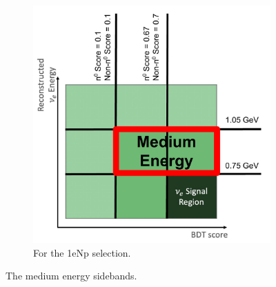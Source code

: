 \begin{figure}[H]
\begin{subfigure}{0.5\linewidth}
        \includegraphics[width=\linewidth]{technote/Sidebands/Figures/NearSideband/NpMediumEnergySideband.pdf}
        \caption{For the 1eNp selection.}
    \end{subfigure}
    \caption{The medium energy sidebands.}
    \label{fig:MediumEnergySideband}
\end{figure}

